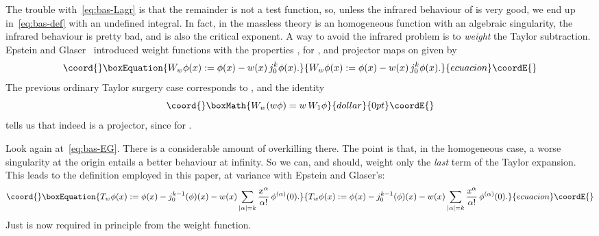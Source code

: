\documentclass[a4paper,12pt]{article}
\renewcommand{\a}{\alpha}          %
\providecommand{\ga}{\gamma}           %
\providecommand{\R}{\mathbb{R}}        %
\renewcommand{\SS}{\mathcal{S}}    %
\providecommand{\7}{\dagger}           %
\theoremstyle{plain}
\theoremstyle{definition}
\begin{document}
The trouble with~\eqref{eq:bas-Lagr} is that the remainder is not a
test function, so, unless the infrared behaviour of \coordHE{} is very good,
we end up in~\eqref{eq:bas-def} with an undefined integral. In fact,
in the massless theory \coordHE{} is an homogeneous function with an
algebraic singularity, the infrared behaviour is pretty bad, and \coordHE{}
is also the critical exponent. A way to avoid the infrared problem is
to \textit{weight} the Taylor subtraction. Epstein and
Glaser~\cite{EG} introduced weight functions \coordHE{} with the properties
\coordHE{}, \myHighlight{$w^{(\a)}(0) = 0$}\coordHE{} for \myHighlight{$0 < |\a| \leq k$}\coordHE{}, and projector
maps \coordHE{} on \myHighlight{$\SS(\R^d)$}\coordHE{} given by
\begin{equation}\coord{}\boxEquation{
W_w\phi(x) := \phi(x) - w(x)\, j^k_0\phi(x).
\label{eq:bas-EG}
}{
W_w\phi(x) := \phi(x) - w(x)\, j^k_0\phi(x).
}{ecuacion}\coordE{}\end{equation}
The previous ordinary Taylor surgery case corresponds to \coordHE{},
and the identity
$$\coord{}\boxMath{
W_w(w\phi) = w\, W_1\phi
}{dollar}{0pt}\coordE{}$$
tells us that \coordHE{} indeed is a projector, since \myHighlight{$W_w(wx^\ga) = 0$}\coordHE{} for
\myHighlight{$|\ga| \leq k$}\coordHE{}.

\smallskip

Look again at~\eqref{eq:bas-EG}. There is a considerable amount of
overkilling there. The point is that, in the homogeneous case, a worse
singularity at the origin entails a better behaviour at infinity. So
we can, and should, weight only the \textit{last} term of the Taylor
expansion. This leads to the definition employed in this paper, at
variance with Epstein and Glaser's:
\begin{equation}\coord{}\boxEquation{
T_w\phi(x) :=  \phi(x) - j^{k-1}_0(\phi)(x)
  - w(x) \sum_{|\a|=k} \frac{x^\a}{\a!} \,\phi^{(\a)}(0).
\label{eq:imp-EG}
}{
T_w\phi(x) :=  \phi(x) - j^{k-1}_0(\phi)(x)
  - w(x) \sum_{|\a|=k} \frac{x^\a}{\a!} \,\phi^{(\a)}(0).
}{ecuacion}\coordE{}\end{equation}
Just \coordHE{} is now required in principle from the weight function.
\end{document}
